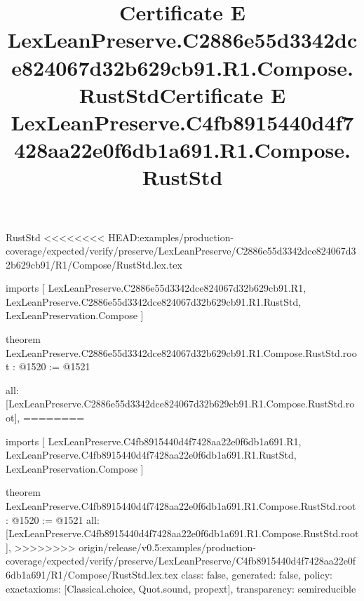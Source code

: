 \begin{lexlean}{RustStd}
<<<<<<<< HEAD:examples/production-coverage/expected/verify/preserve/LexLeanPreserve/C2886e55d3342dce824067d32b629cb91/R1/Compose/RustStd.lex.tex
\title{Certificate E LexLeanPreserve.C2886e55d3342dce824067d32b629cb91.R1.Compose.RustStd}
\begin{coremodule}
imports [
  LexLeanPreserve.C2886e55d3342dce824067d32b629cb91.R1,
  LexLeanPreserve.C2886e55d3342dce824067d32b629cb91.R1.RustStd,
  LexLeanPreservation.Compose
]

theorem LexLeanPreserve.C2886e55d3342dce824067d32b629cb91.R1.Compose.RustStd.root : @1520 := @1521 {
  all: [LexLeanPreserve.C2886e55d3342dce824067d32b629cb91.R1.Compose.RustStd.root],
========
\title{Certificate E LexLeanPreserve.C4fb8915440d4f7428aa22e0f6db1a691.R1.Compose.RustStd}
\begin{coremodule}
imports [
  LexLeanPreserve.C4fb8915440d4f7428aa22e0f6db1a691.R1,
  LexLeanPreserve.C4fb8915440d4f7428aa22e0f6db1a691.R1.RustStd,
  LexLeanPreservation.Compose
]

theorem LexLeanPreserve.C4fb8915440d4f7428aa22e0f6db1a691.R1.Compose.RustStd.root : @1520 := @1521 {
  all: [LexLeanPreserve.C4fb8915440d4f7428aa22e0f6db1a691.R1.Compose.RustStd.root],
>>>>>>>> origin/release/v0.5:examples/production-coverage/expected/verify/preserve/LexLeanPreserve/C4fb8915440d4f7428aa22e0f6db1a691/R1/Compose/RustStd.lex.tex
  class: false,
  generated: false,
  policy: exact{axioms: [Classical.choice, Quot.sound, propext]},
  transparency: semireducible
}


\end{coremodule}}
\end{coremodule}
\end{lexlean}
